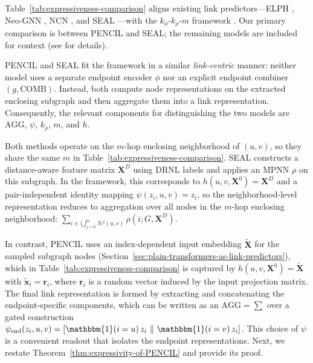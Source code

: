 \documentclass{article}
\theoremstyle{plain}
\theoremstyle{definition}
\theoremstyle{remark}
\begin{document}
Table~\ref{tab:expressiveness-comparison} aligns existing link predictors---ELPH \cite{chamberlain2023graph}, Neo-GNN \cite{yun_neo-gnns_2021}, NCN \cite{wang2024neural}, and SEAL \cite{zhang_link_2018}---with the $k_\phi$-$k_\rho$-$m$ framework \cite{lachi2025bridgingtheorypracticelink}. Our primary comparison is between PENCIL and SEAL; the remaining models are included for context (see \cite{lachi2025bridgingtheorypracticelink} for details).

PENCIL and SEAL fit the framework in a similar \emph{link-centric} manner: neither model uses a separate endpoint encoder $\phi$ nor an explicit endpoint combiner $(g,\mathrm{COMB})$. Instead, both compute node representations on the extracted enclosing subgraph and then aggregate them into a link representation. Consequently, the relevant components for distinguishing the two models are $\mathrm{AGG}$, $\psi$, $k_\rho$, $m$, and $h$.

Both methods operate on the $m$-hop enclosing neighborhood of $(u,v)$, so they share the same $m$ in Table~\ref{tab:expressiveness-comparison}. SEAL constructs a distance-aware feature matrix $\mathbf{X}^D$ using DRNL labels \cite{zhang_link_2018} and applies an MPNN $\rho$ on this subgraph. In the framework, this corresponds to $h(u,v,\mathbf{X}^0)=\mathbf{X}^D$ and a pair-independent identity mapping $\psi(z_i,u,v)=z_i$, so the neighborhood-level representation reduces to aggregation over all nodes in the $m$-hop enclosing neighborhood:
$\sum_{i \in \bigcup_{j=0}^m \mathcal{N}^j(u,v)} \rho(i;G,\mathbf{X}^D)$.

In contrast, PENCIL uses an index-dependent input embedding $\tilde{\mathbf{X}}$ for the sampled subgraph nodes (Section~\ref{sec:plain-transformers-as-link-predictors}), which in Table~\ref{tab:expressiveness-comparison} is captured by $h(u,v,\mathbf{X}^0)=\tilde{\mathbf{X}}$ with $\tilde{\mathbf{x}}_i=\mathbf{r}_i$, where $\mathbf{r}_i$ is a random vector induced by the input projection matrix. The final link representation is formed by extracting and concatenating the endpoint-specific components, which can be written as an $\mathrm{AGG}=\sum$ over a gated construction
$\psi_{\mathrm{end}}(z_i,u,v) = [\mathbbm{1}(i=u)\,z_i \ \| \ \mathbbm{1}(i=v)\,z_i]$.
This choice of $\psi$ is a convenient readout that isolates the endpoint representations. Next, we restate Theorem~\ref{thm:expressivity-of-PENCIL} and provide its proof.
\end{document}

